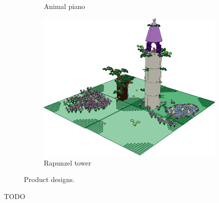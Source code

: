\documentclass{PDS}
\begin{document}
\begin{figure}[htbp]
\begin{subfigure}[b]{0.3\textwidth}
        \caption{Animal piano}
        \label{fig:piano}
    \end{subfigure}
    \hfill
    \begin{subfigure}[b]{0.3\textwidth}
        \centering
        \includegraphics[width=\textwidth]{./figures/rapunzel.png}
        \caption{Rapunzel tower}
        \label{fig:rapunzel}
    \end{subfigure}
    \caption{Product designs.}
    \label{fig:kinderuni}
\end{figure}

TODO
\end{document}
